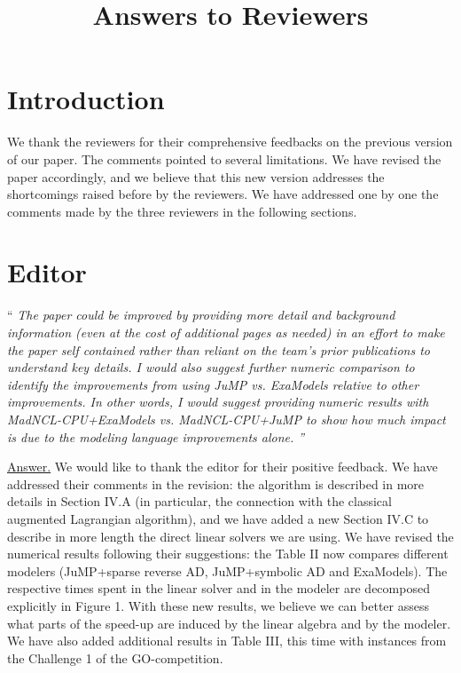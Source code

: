 \documentclass[10pt,a4paper]{article}
\newenvironment{quotereviewer}{\vspace{.5cm}{\underline\reviewername} ``\it\footnotesize}{''}
\newcommand{\answer}{\vspace{1mm}\underline{Answer.} }
\begin{document}
\title{\textbf{Answers to Reviewers}\\
}
\maketitle

\section*{Introduction}
We thank the reviewers for their comprehensive feedbacks on the previous
version of our paper. The comments pointed to several limitations.
We have revised the paper accordingly, and we believe that this new version addresses
the shortcomings raised before by the reviewers.
We have addressed one by one the comments made by the three reviewers in
the following sections.

\section{Editor}
\def\reviewername{Editor}

\begin{quotereviewer}
The paper could be improved by providing more detail and background information (even at the cost of additional pages as needed) in an effort to make the paper self contained rather than reliant on the team's prior publications to understand key details. I would also suggest further numeric comparison to identify the improvements from using JuMP vs. ExaModels relative to other improvements. In other words, I would suggest providing numeric results with MadNCL-CPU+ExaModels vs. MadNCL-CPU+JuMP to show how much impact is due to the modeling language improvements alone.
\end{quotereviewer}

\answer
We would like to thank the editor for their positive feedback. We have addressed
their comments in the revision: the algorithm is described in more details in Section IV.A
(in particular, the connection with the classical augmented Lagrangian algorithm),
and we have added a new Section IV.C to describe in more length the direct linear solvers we are using.
We have revised the numerical results following their suggestions: the Table II
now compares different modelers (JuMP+sparse reverse AD, JuMP+symbolic AD and ExaModels).
The respective times spent in the linear solver and in the modeler are decomposed explicitly
in Figure 1. With these new results, we believe we can better assess what parts
of the speed-up are induced by the linear algebra and by the modeler.
We have also added additional results in Table III, this time with instances
from the Challenge 1 of the GO-competition.
\end{document}
